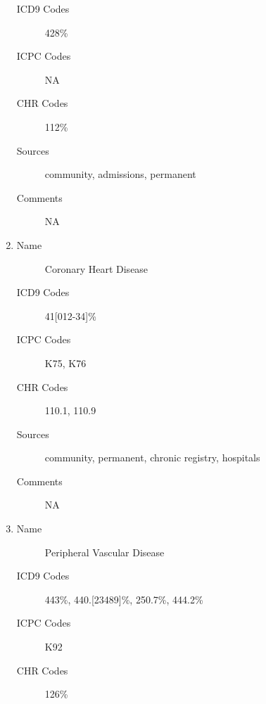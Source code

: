 \documentclass[a4paper,12pt]{article}
\begin{document}
\begin{appendices}
\begin{enumerate}
\begin{description}
   						\item[ICD9 Codes] 428\%
   						\item[ICPC Codes] NA
   						\item[CHR Codes] 112\%
   						\item[Sources] community, admissions, permanent
   						\item[Comments] NA
   					\end{description}
   					\item
   					\begin{description}
   						\item[Name] Coronary Heart Disease
   						\item[ICD9 Codes] 41[012-34]\%
   						\item[ICPC Codes] K75, K76
   						\item[CHR Codes] 110.1, 110.9
   						\item[Sources] community, permanent, chronic registry, hospitals
   						\item[Comments] NA
   					\end{description}
   					\item
   					\begin{description}
   						\item[Name] Peripheral Vascular Disease
   						\item[ICD9 Codes] 443\%, 440.[23489]\%, 250.7\%, 444.2\%
   						\item[ICPC Codes] K92
   						\item[CHR Codes] 126\%

\end{description}
\end{enumerate}
\end{appendices}
\end{document}
